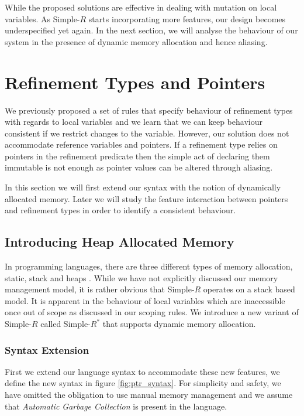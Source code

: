 \documentclass[a4paper,12pt]{report}
\begin{document}
\par
While the proposed solutions are effective in dealing with mutation on local 
variables. As Simple-$R$ starts incorporating more features, our design becomes 
underspecified yet again. In the next section, we will analyse 
the behaviour of our system in the presence of dynamic memory allocation 
and hence aliasing.

\section{Refinement Types and Pointers}
We previously proposed a set of rules that specify behaviour of refinement 
types with regards to local variables and we learn that we can keep behaviour 
consistent if we restrict changes to the variable. However, our solution does 
not accommodate reference variables and pointers. If a refinement type 
relies on pointers in the refinement predicate then the simple act of declaring 
them immutable is not enough as pointer values can be altered through aliasing. 

\par
In this section we will first extend our syntax with the notion of dynamically 
allocated memory. Later we will study the feature interaction between 
pointers and refinement types in order to identify a consistent behaviour. 

\subsection{Introducing Heap Allocated Memory}
In programming languages, there are three different types of memory allocation, 
static, stack and heaps \cite{heapVsStack}. While we have not explicitly 
discussed our memory management model, it is rather obvious that Simple-$R$ 
operates on a stack based model. It is apparent in the behaviour of local 
variables which are inaccessible once out of scope as discussed in our scoping rules. 
We introduce a new variant of Simple-$R$ called Simple-$R^{*}$ that supports 
dynamic memory allocation.

\subsubsection{Syntax Extension}
First we extend our language syntax to accommodate these new features, we define 
the new syntax in figure \ref{fig:ptr_syntax}. For simplicity and safety, 
we have omitted the obligation to use manual memory management and we 
assume that \textit{Automatic Garbage Collection} \cite{GC} is present in 
the language. 
\end{document}
